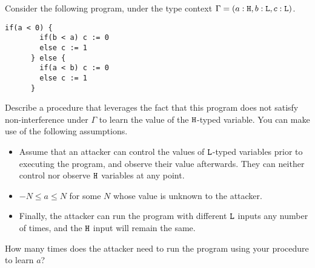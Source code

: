 \documentclass[10pt]{article}
\begin{document}
\begin{enumerate}
Consider the following program, under the type context $\Gamma = (a : \texttt{\upshape H}, b : \texttt{\upshape L}, c : \texttt{\upshape L})$.
\begin{lstlisting}[escapechar=\#]
      if(a < 0) {
        if(b < a) c := 0
        else c := 1
      } else {
        if(a < b) c := 0
        else c := 1
      }
\end{lstlisting}
Describe a procedure that leverages the fact that this program does not satisfy non-interference under $\Gamma$ to learn the value of the $\texttt{\upshape H}$-typed variable. You can make use of the following assumptions.
\begin{itemize}
\item Assume that an attacker can control the values of $\texttt{\upshape L}$-typed variables prior to executing the program, and observe their value afterwards. They can neither control nor observe $\texttt{\upshape H}$ variables at any point. 
\item $-N \le a \le N$ for some $N$ whose value is unknown to the attacker. 
\item Finally, the attacker can run the program with different $\texttt{\upshape L}$ inputs any number of times, and the $\texttt{\upshape H}$ input will remain the same.
\end{itemize}
How many times does the attacker need to run the program using your procedure to learn $a$? 


\end{enumerate}
\end{document}
